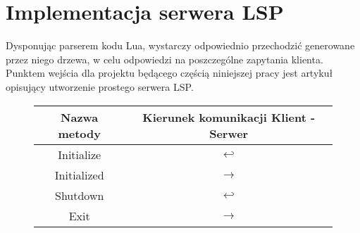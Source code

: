 \chapter{Implementacja serwera LSP}
Dysponując parserem kodu Lua, wystarczy odpowiednio przechodzić generowane przez niego drzewa, w celu odpowiedzi na poszczególne zapytania klienta. Punktem wejścia dla projektu będącego częścią niniejszej pracy jest artykuł \cite{lsp_sample} opisujący utworzenie prostego serwera LSP.

\begin{figure}[H]
    \centering
\begin{tabular}{|c|c|}
\hline
Nazwa metody & Kierunek komunikacji Klient - Serwer\\
\hline
Initialize & $\hookleftarrow$ \\   
\hline
Initialized & $\rightarrow$ \\
\hline
Shutdown & $\hookleftarrow$ \\   
\hline
Exit & $\rightarrow$ \\
\hline
\end{tabular}
\end{figure}

